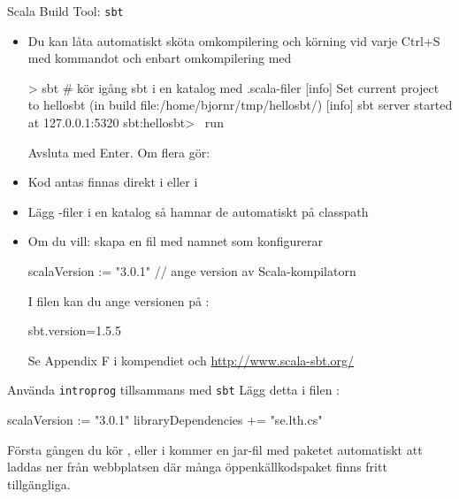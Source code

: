 \begin{Slide}{Scala Build Tool: \texttt{sbt}}\SlideFontSmall
\begin{itemize}
\item Du kan låta  automatiskt sköta omkompilering och körning vid varje Ctrl+S med kommandot 
och enbart omkompilering med 
\begin{REPL}
> sbt              # kör igång sbt i en katalog med .scala-filer
[info] Set current project to hellosbt (in build file:/home/bjornr/tmp/hellosbt/)
[info] sbt server started at 127.0.0.1:5320
sbt:hellosbt> ~run
\end{REPL}
Avsluta med Enter. Om flera  gör: 
\item Kod antas finnas direkt i  eller i 
\item Lägg -filer i en katalog  så hamnar de automatiskt på classpath
\item Om du vill: skapa en fil med namnet  som konfigurerar 
\begin{Code}
scalaVersion := "3.0.1"    // ange version av Scala-kompilatorn
\end{Code}
I filen  kan du ange versionen på :
\begin{Code}
sbt.version=1.5.5
\end{Code}
Se Appendix F i kompendiet och \url{http://www.scala-sbt.org/}
\end{itemize}
\end{Slide}



\begin{Slide}{Använda \texttt{introprog} tillsammans med \texttt{sbt}}
Lägg detta i filen :
\begin{Code}
scalaVersion := "3.0.1"
libraryDependencies += "se.lth.cs" %
\end{Code}
Första gången du kör ,  eller  i  kommer en jar-fil med paketet  automatiskt att laddas ner från webbplatsen  där många öppenkällkodspaket finns fritt tillgängliga. \\~\\
\end{Slide}


\ifkompendium\else


